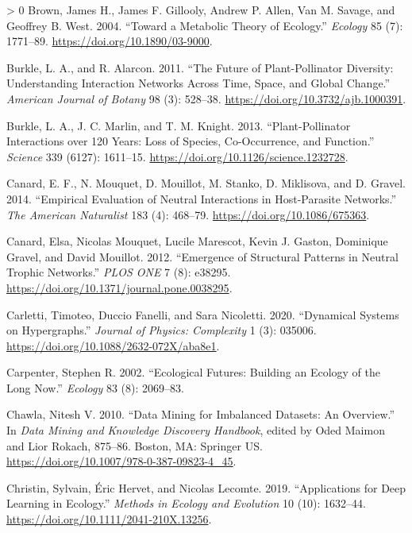 \documentclass[10pt,oneside]{article}
\newlength{\cslhangindent}
\newenvironment{CSLReferences}[3] %
 {%
  \setlength{\parindent}{0pt}
  \ifodd #1 \everypar{\setlength{\hangindent}{\cslhangindent}}\ignorespaces\fi
  \ifnum #2 > 0
  \setlength{\parskip}{#2\baselineskip}
  \fi
 }%
 {}
\begin{document}
\begin{CSLReferences}{1}{0}
\leavevmode\hypertarget{ref-Brown2004MetThe}{}%
Brown, James H., James F. Gillooly, Andrew P. Allen, Van M. Savage, and
Geoffrey B. West. 2004. {``Toward a Metabolic Theory of Ecology.''}
\emph{Ecology} 85 (7): 1771--89. \url{https://doi.org/10.1890/03-9000}.

\leavevmode\hypertarget{ref-Burkle2011FutPla}{}%
Burkle, L. A., and R. Alarcon. 2011. {``The Future of Plant-Pollinator
Diversity: Understanding Interaction Networks Across Time, Space, and
Global Change.''} \emph{American Journal of Botany} 98 (3): 528--38.
\url{https://doi.org/10.3732/ajb.1000391}.

\leavevmode\hypertarget{ref-Burkle2013PlaInt}{}%
Burkle, L. A., J. C. Marlin, and T. M. Knight. 2013. {``Plant-Pollinator
Interactions over 120 Years: Loss of Species, Co-Occurrence, and
Function.''} \emph{Science} 339 (6127): 1611--15.
\url{https://doi.org/10.1126/science.1232728}.

\leavevmode\hypertarget{ref-Canard2014EmpEva}{}%
Canard, E. F., N. Mouquet, D. Mouillot, M. Stanko, D. Miklisova, and D.
Gravel. 2014. {``Empirical Evaluation of Neutral Interactions in
Host-Parasite Networks.''} \emph{The American Naturalist} 183 (4):
468--79. \url{https://doi.org/10.1086/675363}.

\leavevmode\hypertarget{ref-Canard2012EmeStr}{}%
Canard, Elsa, Nicolas Mouquet, Lucile Marescot, Kevin J. Gaston,
Dominique Gravel, and David Mouillot. 2012. {``Emergence of Structural
Patterns in Neutral Trophic Networks.''} \emph{PLOS ONE} 7 (8): e38295.
\url{https://doi.org/10.1371/journal.pone.0038295}.

\leavevmode\hypertarget{ref-Carletti2020DynSys}{}%
Carletti, Timoteo, Duccio Fanelli, and Sara Nicoletti. 2020.
{``Dynamical Systems on Hypergraphs.''} \emph{Journal of Physics:
Complexity} 1 (3): 035006.
\url{https://doi.org/10.1088/2632-072X/aba8e1}.

\leavevmode\hypertarget{ref-Carpenter2002EcoFut}{}%
Carpenter, Stephen R. 2002. {``Ecological Futures: Building an Ecology
of the Long Now.''} \emph{Ecology} 83 (8): 2069--83.

\leavevmode\hypertarget{ref-Chawla2010DatMin}{}%
Chawla, Nitesh V. 2010. {``Data Mining for Imbalanced Datasets: An
Overview.''} In \emph{Data Mining and Knowledge Discovery Handbook},
edited by Oded Maimon and Lior Rokach, 875--86. Boston, MA: Springer US.
\url{https://doi.org/10.1007/978-0-387-09823-4_45}.

\leavevmode\hypertarget{ref-Christin2019AppDee}{}%
Christin, Sylvain, Éric Hervet, and Nicolas Lecomte. 2019.
{``Applications for Deep Learning in Ecology.''} \emph{Methods in
Ecology and Evolution} 10 (10): 1632--44.
\url{https://doi.org/10.1111/2041-210X.13256}.


\end{CSLReferences}
\end{document}
